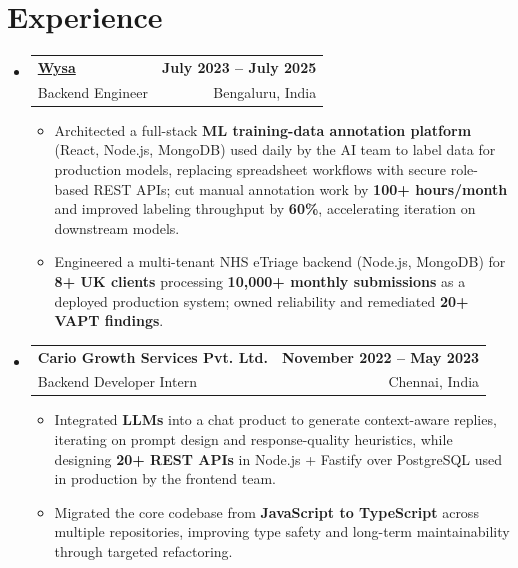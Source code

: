 \documentclass[letterpaper,10pt]{article}
\makeatletter
\newcommand{\resumeItem}[1]{
  \item\small{#1\vspace{-1pt}}
}
\newcommand{\resumeSubheading}[4]{
  \vspace{1pt}\item
    \begin{tabular*}{0.985\textwidth}[t]{l@{\extracolsep{\fill}}r}
      \textbf{#1} & \textbf{\small #2} \\
      {\small\color{ResumeSlate} #3} & {\small\color{ResumeSlate} #4} \\
    \end{tabular*}\vspace{-6pt}
}
\newcommand{\resumeSubHeadingListStart}{\begin{itemize}[leftmargin=0.0in, label={}, itemsep=2pt, topsep=2pt]}
\newcommand{\resumeSubHeadingListEnd}{\end{itemize}}
\newcommand{\resumeItemListStart}{\begin{itemize}[leftmargin=0.18in, itemsep=2pt, topsep=1pt]}
\newcommand{\resumeItemListEnd}{\end{itemize}\vspace{-4pt}}
\makeatother
\begin{document}
\section{Experience}
\resumeSubHeadingListStart
  \resumeSubheading
    {\href{https://www.wysa.io}{Wysa}}{July 2023 -- July 2025}
    {Backend Engineer}{Bengaluru, India}
    \resumeItemListStart
      \resumeItem{Architected a full-stack \textbf{ML training-data annotation platform} (React, Node.js, MongoDB) used daily by the AI team to label data for production models, replacing spreadsheet workflows with secure role-based REST APIs; cut manual annotation work by \textbf{100+ hours/month} and improved labeling throughput by \textbf{60\%}, accelerating iteration on downstream models.}
      \resumeItem{Engineered a multi-tenant NHS eTriage backend (Node.js, MongoDB) for \textbf{8+ UK clients} processing \textbf{10{,}000+ monthly submissions} as a deployed production system; owned reliability and remediated \textbf{20+ VAPT findings}.}
    \resumeItemListEnd
  \resumeSubheading
    {Cario Growth Services Pvt. Ltd.}{November 2022 -- May 2023}
    {Backend Developer Intern}{Chennai, India}
    \resumeItemListStart
      \resumeItem{Integrated \textbf{LLMs} into a chat product to generate context-aware replies, iterating on prompt design and response-quality heuristics, while designing \textbf{20+ REST APIs} in Node.js + Fastify over PostgreSQL used in production by the frontend team.}
      \resumeItem{Migrated the core codebase from \textbf{JavaScript to TypeScript} across multiple repositories, improving type safety and long-term maintainability through targeted refactoring.}
    \resumeItemListEnd
\resumeSubHeadingListEnd
\vspace{-4pt}
\end{document}
